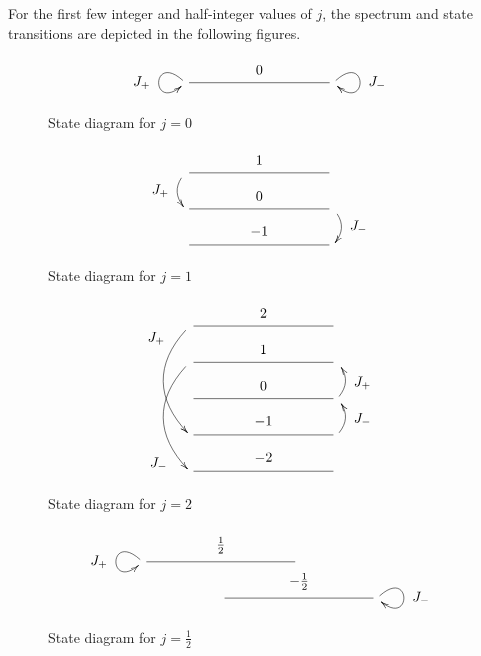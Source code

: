 For the first few integer and half-integer values of $j$, the spectrum
and state transitions are depicted in the following figures.
\begin{figure}[!h]
  \[
  \xymatrix@R=20pt@C=100pt{
    \ar@(ul,dl)[]_*+{J_+} \ar@{-}[r]^-*+{0} & \ar@(ur,dr)[]^*+{J_-}
  }
  \]
  \caption{State diagram for $j=0$}
  \label{J0Diagram}
\end{figure}
\pagebreak
\begin{figure}[!h]
  \[
  \xymatrix@R=20pt@C=100pt{
    \ar@/_/[d]_*+{J_+} \ar@{-}[r]^-*+{1} & \\
    \ar@{-}[r]^-*+{0} & \ar@/^/[d]^*+{J_-} \\
    \ar@{-}[r]^-*+{-1} &  \\
  }
  \]
  \caption{State diagram for $j=1$}
  \label{J1Diagram}
\end{figure}
\begin{figure}[!h]
  \[
  \xymatrix@R=20pt@C=100pt{
    \ar@(dl,ul)[ddd]_<<<<<*+{J_+} \ar@{-}[r]^-*+{2} & \\
    \ar@(dl,ul)[ddd]_>>>>>*+{J_-} \ar@{-}[r]^-*+{1} & \\
    \ar@{-}[r]^-*+{0} & \ar@/_/[u]_-*+{J_+} \\
    \ar@{-}[r]^-*+{-1} & \ar@/_/[u]_-*+{J_-} \\
    \ar@{-}[r]^-*+{-2} &
  }
  \]
  \caption{State diagram for $j=2$}
  \label{J2Diagram}
\end{figure}
\begin{figure}[!h]
  \[
  \xymatrix@R=20pt@C=50pt{
    \ar@(ul,dl)[]_*+{J_+} \ar@{-}[rr]^-*+{\frac12} & & \\
                                                  & \ar@{-}[rr]^-*+{-\frac12} & & \ar@(ur,dr)[]^*+{J_-} \\
  }
  \]
  \caption{State diagram for $j=\frac12$}
  \label{J1/2Diagram}
\end{figure}
